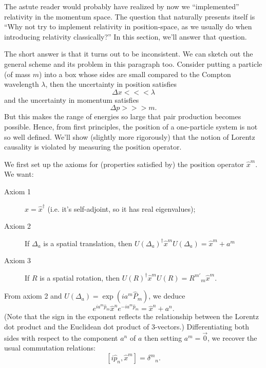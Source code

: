 
The astute reader would probably have realized by now we
``implemented'' relativity in the momentum space. The question
that naturally presents itself is ``Why not try to implement
relativity in position-space, as we usually do when introducing
relativity classically?'' In this section, we'll answer that
question. 

The short answer is that it turns out to be inconsistent. We can
sketch out the general scheme and its problem in this paragraph
too. Consider putting a particle (of mass $m$) into a box whose
sides are small compared to the Compton wavelength $\lambda$,
then the uncertainty in position satisfies
\begin{equation}%
\Delta x<<<\lambda
\end{equation}
and the uncertainty in momentum satisfies
\begin{equation}%
\Delta p>>> m.
\end{equation}
But this makes the range of energies so large that pair
production becomes possible. Hence, from first principles, the
position of a one-particle system is not so well defined. We'll
show (slightly more rigorously) that the notion of Lorentz
causality is violated by measuring the position operator.

We first set up the axioms for (properties satisfied by) the
position operator $\widehat{x}^{m}$. We want:
\begin{description}
\item[Axiom 1] $\widehat{x}=\widehat{x}^{\dag}$ (i.e. it's
  self-adjoint, so it has real eigenvalues);
\item[Axiom 2] If $\Delta_{a}$ is a spatial translation, then
  $U(\Delta_{a})^{\dag}\widehat{x}^{m}U(\Delta_{a}) = \widehat{x}^{m}+a^{m}$
\item[Axiom 3] If $R$ is a spatial rotation, then
  $U(R)^{\dag}\widehat{x}^{m}U(R) = {R^{m'}}_{m}\widehat{x}^{m}$.
\end{description}
From axiom 2 and $U(\Delta_{a}) = \exp(ia^{m}\widehat{P}_{m})$,
we deduce
\begin{equation}%
e^{ia^{m}\widehat{p}_{m}}\widehat{x}^{n}e^{-ia^{m}\widehat{p}_{m}}=\widehat{x}^{n}+a^{n}.
\end{equation}
(Note that the sign in the exponent reflects the relationship
between the Lorentz dot product and the Euclidean dot product of
3-vectors.) Differentiating both sides with respect to the
component $a^{n}$ of $a$ then setting $a^{m}=\vec{0}$, we recover
the usual commutation relations:
\begin{equation}\label{eq:recoveryCanonicalCommutationRelations}
[i\widehat{p}_{n},\widehat{x}^{m}] = {\delta^{m}}_{n}.
\end{equation}


